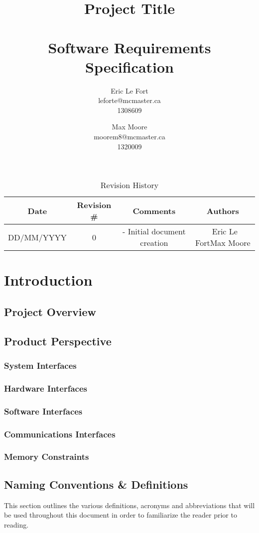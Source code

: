\documentclass[titlepage]{article}
\title{Project Title\\~\\Software Requirements Specification}
\author{
Eric Le Fort\\leforte@mcmaster.ca\\1308609\and
Max Moore\\moorem8@mcmaster.ca\\1320009
}
\begin{document}
\maketitle


\tableofcontents
\listoffigures
\listoftables


\vfill
\begin{table}[!htbp]
\centering
\begin{tabular}{| C{3} | C{2} | C{5} | C{2.5} |}\hline
	Date			&Revision \#	&Comments						&Authors\\\hline
	DD/MM/YYYY		&0				&- Initial document creation	&~Eric Le Fort\newline Max Moore\\\hline
\end{tabular}
\caption{Revision History}
\end{table}
\newpage

\section{Introduction}
\subsection{Project Overview}
\subsection{Product Perspective}
\subsubsection{System Interfaces}
\subsubsection{Hardware Interfaces}
\subsubsection{Software Interfaces}
\subsubsection{Communications Interfaces}
\subsubsection{Memory Constraints}
\subsection{Naming Conventions \& Definitions}
This section outlines the various definitions, acronyms and abbreviations that will be used throughout this document in order to familiarize the reader prior to reading.
\end{document}
